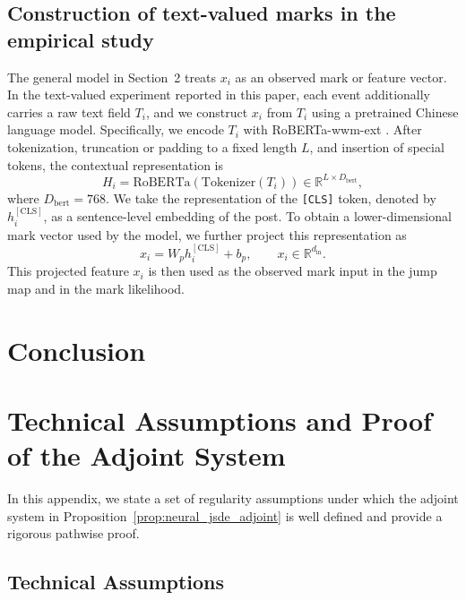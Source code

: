 \documentclass[11pt]{article}
\theoremstyle{definition}
\numberwithin{equation}{section}
\numberwithin{theorem}{section}
\numberwithin{proposition}{section}
\numberwithin{lemma}{section}
\numberwithin{corollary}{section}
\numberwithin{definition}{section}
\numberwithin{remark}{section}
\newcommand{\1}{\mathbbm{1}}
\begin{document}
\subsection{Construction of text-valued marks in the empirical study}

The general model in Section~2 treats $x_i$ as an observed mark or feature vector. 
In the text-valued experiment reported in this paper, each event additionally carries a raw text field $T_i$, and we construct $x_i$ from $T_i$ using a pretrained Chinese language model. 
Specifically, we encode $T_i$ with RoBERTa-wwm-ext \citep{cui2020revisiting}. 
After tokenization, truncation or padding to a fixed length $L$, and insertion of special tokens, the contextual representation is
\[
H_i = \mathrm{RoBERTa}(\mathrm{Tokenizer}(T_i)) \in \mathbb{R}^{L \times D_{\mathrm{bert}}},
\]
where $D_{\mathrm{bert}}=768$. 
We take the representation of the \texttt{[CLS]} token, denoted by $h_i^{[\mathrm{CLS}]}$, as a sentence-level embedding of the post. 
To obtain a lower-dimensional mark vector used by the model, we further project this representation as
\[
x_i = W_p h_i^{[\mathrm{CLS}]} + b_p,
\qquad x_i \in \mathbb{R}^{d_{\text{in}}}.
\]
This projected feature $x_i$ is then used as the observed mark input in the jump map and in the mark likelihood.



\section{Conclusion}



\appendix

\section{Technical Assumptions and Proof of the Adjoint System}
\label{app:adjoint_rigorous}

In this appendix, we state a set of regularity assumptions under which the adjoint system in Proposition~\ref{prop:neural_jsde_adjoint} is well defined and provide a rigorous pathwise proof.

\subsection{Technical Assumptions}
\end{document}
